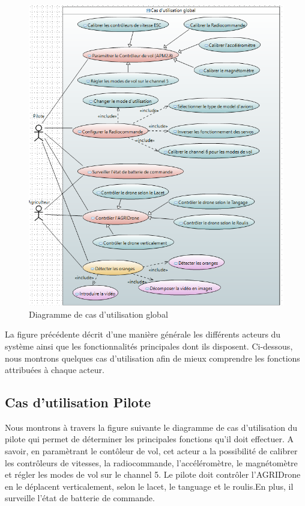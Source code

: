 	
		\begin{figure} [h]
		\begin{center}
			\centering	
		\includegraphics[width=0.9\linewidth]{Images/Diagramme de cas d'utliisation global}	
		\end{center}
		\caption{Diagramme de cas d'utilisation global}
		\end{figure}
		\newpage
		
		La figure précédente décrit d'une manière générale les différents acteurs du système ainsi que les fonctionnalités principales dont ils disposent.
		Ci-dessous, nous montrons quelques cas d'utilisation afin de mieux comprendre les fonctions attribuées à chaque acteur.
	
		\subsection{Cas d'utilisation Pilote}
		Nous montrons à travers la figure suivante le diagramme de cas d’utilisation du pilote qui permet de déterminer les principales fonctions qu’il doit effectuer. A savoir, en paramètrant le contôleur de vol, cet acteur a la possibilité de calibrer les contrôleurs de vitesses, la radiocommande, l'accéléromètre, le magnétomètre et régler les modes de vol sur le channel 5. Le pilote doit contrôler l'AGRIDrone en le déplacent verticalement, selon le lacet, le tanguage et le roulis.En plus, il surveille l'état de batterie de commande. 
		

